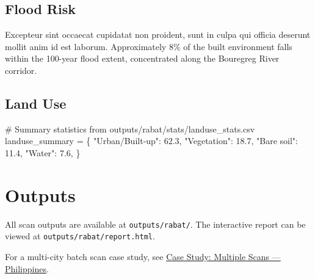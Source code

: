 \documentclass[
  letterpaper,
  DIV=11,
  numbers=noendperiod]{scrreprt}
\newenvironment{Shaded}{\begin{snugshade}}{\end{snugshade}}
\newcommand{\CommentTok}[1]{\textcolor[rgb]{0.37,0.37,0.37}{#1}}
\newcommand{\FloatTok}[1]{\textcolor[rgb]{0.68,0.00,0.00}{#1}}
\newcommand{\NormalTok}[1]{\textcolor[rgb]{0.00,0.23,0.31}{#1}}
\newcommand{\OperatorTok}[1]{\textcolor[rgb]{0.37,0.37,0.37}{#1}}
\newcommand{\StringTok}[1]{\textcolor[rgb]{0.13,0.47,0.30}{#1}}
\begin{document}
\subsection{Flood Risk}\label{flood-risk}

Excepteur sint occaecat cupidatat non proident, sunt in culpa qui
officia deserunt mollit anim id est laborum. Approximately 8\% of the
built environment falls within the 100-year flood extent, concentrated
along the Bouregreg River corridor.

\subsection{Land Use}\label{land-use}

\begin{Shaded}
\begin{Highlighting}[]
\CommentTok{\# Summary statistics from outputs/rabat/stats/landuse\_stats.csv}
\NormalTok{landuse\_summary }\OperatorTok{=}\NormalTok{ \{}
    \StringTok{"Urban/Built{-}up"}\NormalTok{: }\FloatTok{62.3}\NormalTok{,}
    \StringTok{"Vegetation"}\NormalTok{: }\FloatTok{18.7}\NormalTok{,}
    \StringTok{"Bare soil"}\NormalTok{: }\FloatTok{11.4}\NormalTok{,}
    \StringTok{"Water"}\NormalTok{: }\FloatTok{7.6}\NormalTok{,}
\NormalTok{\}}
\end{Highlighting}
\end{Shaded}

\section{Outputs}\label{outputs}

All scan outputs are available at \texttt{outputs/rabat/}. The
interactive report can be viewed at \texttt{outputs/rabat/report.html}.

\begin{tcolorbox}[enhanced jigsaw, arc=.35mm, bottomrule=.15mm, bottomtitle=1mm, breakable, colback=white, colbacktitle=quarto-callout-note-color!10!white, colframe=quarto-callout-note-color-frame, coltitle=black, left=2mm, leftrule=.75mm, opacityback=0, opacitybacktitle=0.6, rightrule=.15mm, title=\textcolor{quarto-callout-note-color}{\faInfo}\hspace{0.5em}{Note}, titlerule=0mm, toprule=.15mm, toptitle=1mm]

For a multi-city batch scan case study, see
\href{case-multiple-philippines.qmd}{Case Study: Multiple Scans ---
Philippines}.

\end{tcolorbox}
\end{document}
